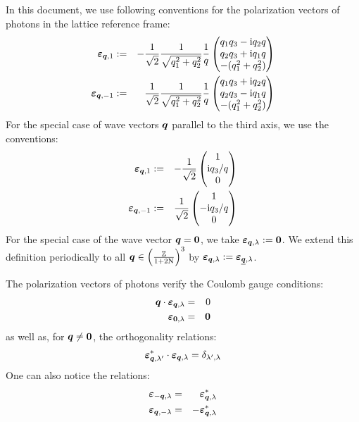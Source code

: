 \documentclass[10pt,a4paper,twoside,openany]{book}
\begin{document}
In this document, we use following conventions for the polarization vectors of photons in the lattice reference frame:
\begin{eqnarray*}
\boldsymbol{\varepsilon}_{{\boldsymbol{q}},{1}} & := & - \frac 1 {\sqrt 2} \frac 1 {\sqrt{{q}_{1}^2 + {q}_{2}^2}} \frac 1 q \begin{pmatrix}  {q}_{1} {q}_{3} - \mathrm{i} {q}_{2} q \\ {q}_{2} {q}_{3} + \mathrm{i} {q}_{1} q \\ -( {q}_{1}^2 + {q}_{2}^2 )  \end{pmatrix} \\
\boldsymbol{\varepsilon}_{{\boldsymbol{q}},{-1}} & := & \frac 1 {\sqrt 2} \frac 1 {\sqrt{{q}_{1}^2 + {q}_{2}^2}} \frac 1 q \begin{pmatrix}  {q}_{1} {q}_{3} + \mathrm{i} {q}_{2} q \\ {q}_{2} {q}_{3} - \mathrm{i} {q}_{1} q \\ -( {q}_{1}^2 + {q}_{2}^2 )  \end{pmatrix}
\end{eqnarray*}
For the special case of wave vectors $\boldsymbol{q}$ parallel to the third axis, we use the conventions:
\begin{eqnarray*}
\boldsymbol{\varepsilon}_{{\boldsymbol{q}},{1}} & := & - \frac 1 {\sqrt 2} \begin{pmatrix}  1 \\ \mathrm{i} {q}_{3} / q \\ 0  \end{pmatrix} \\
\boldsymbol{\varepsilon}_{{\boldsymbol{q}},{-1}} & := & \frac 1 {\sqrt 2} \begin{pmatrix}  1 \\ - \mathrm{i} {q}_{3} / q \\ 0  \end{pmatrix}
\end{eqnarray*}
For the special case of the wave vector $\boldsymbol{q} = \boldsymbol{0}$, we take $\boldsymbol{\varepsilon}_{{\boldsymbol{q}},{\lambda}} := \boldsymbol{0}$. We extend this definition periodically to all $\boldsymbol{q} \in \left( \frac{\mathbb{Z}}{1 + 2 \mathrm N} \right)^3$ by $\boldsymbol{\varepsilon}_{{\boldsymbol{q}},{\lambda}} := \boldsymbol{\varepsilon}_{{\underline{\boldsymbol{q}}},{\lambda}}$.

The polarization vectors of photons verify the Coulomb gauge conditions:
\begin{eqnarray*}
\boldsymbol{q} \cdot \boldsymbol{\varepsilon}_{{\boldsymbol{q}},{\lambda}} & = & 0 \\
\boldsymbol{\varepsilon}_{{\boldsymbol{0}},{\lambda}} & = & \boldsymbol{0}
\end{eqnarray*}
as well as, for $\boldsymbol{q} \neq \boldsymbol{0}$, the orthogonality relations:
\begin{equation*}
\boldsymbol{\varepsilon}_{{\boldsymbol{q}},{\lambda'}}^* \cdot \boldsymbol{\varepsilon}_{{\boldsymbol{q}},{\lambda}} = \delta_{\lambda',\lambda}
\end{equation*}
One can also notice the relations:
\begin{eqnarray*}
\boldsymbol{\varepsilon}_{{- \boldsymbol{q}},{\lambda}} & = & \boldsymbol{\varepsilon}_{{\boldsymbol{q}},{\lambda}}^* \\
\boldsymbol{\varepsilon}_{{\boldsymbol{q}},{- \lambda}} & = & - \boldsymbol{\varepsilon}_{{\boldsymbol{q}},{\lambda}}^*
\end{eqnarray*}
\end{document}
